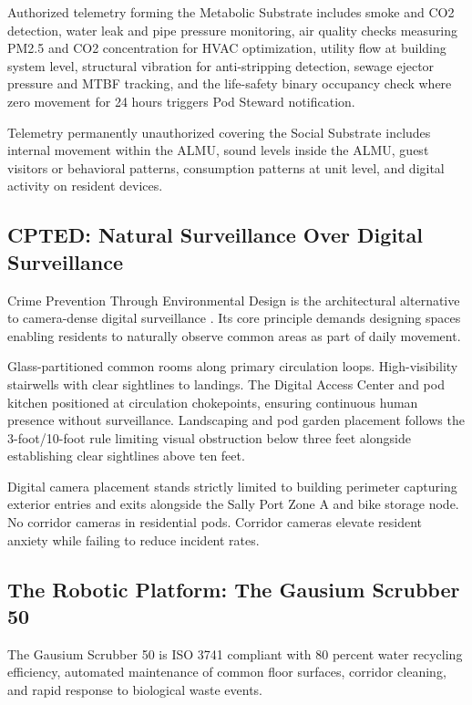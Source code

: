 \documentclass[12pt, letterpaper]{article}
\begin{document}
Authorized telemetry forming the Metabolic Substrate includes smoke and CO2 detection, water leak and pipe pressure monitoring, air quality checks measuring PM2.5 and CO2 concentration for HVAC optimization, utility flow at building system level, structural vibration for anti-stripping detection, sewage ejector pressure and MTBF tracking, and the life-safety binary occupancy check where zero movement for 24 hours triggers Pod Steward notification.

Telemetry permanently unauthorized covering the Social Substrate includes internal movement within the ALMU, sound levels inside the ALMU, guest visitors or behavioral patterns, consumption patterns at unit level, and digital activity on resident devices.


\subsection{CPTED: Natural Surveillance Over Digital Surveillance}

Crime Prevention Through Environmental Design is the architectural alternative to camera-dense digital surveillance \citep{ctbuh_highrise_2024}. Its core principle demands designing spaces enabling residents to naturally observe common areas as part of daily movement.

Glass-partitioned common rooms along primary circulation loops. High-visibility stairwells with clear sightlines to landings. The Digital Access Center and pod kitchen positioned at circulation chokepoints, ensuring continuous human presence without surveillance. Landscaping and pod garden placement follows the 3-foot/10-foot rule limiting visual obstruction below three feet alongside establishing clear sightlines above ten feet.

Digital camera placement stands strictly limited to building perimeter capturing exterior entries and exits alongside the Sally Port Zone A and bike storage node. No corridor cameras in residential pods. Corridor cameras elevate resident anxiety while failing to reduce incident rates.

\subsection{The Robotic Platform: The Gausium Scrubber 50}

The Gausium Scrubber 50 is ISO 3741 compliant with 80 percent water recycling efficiency, automated maintenance of common floor surfaces, corridor cleaning, and rapid response to biological waste events.
\end{document}
